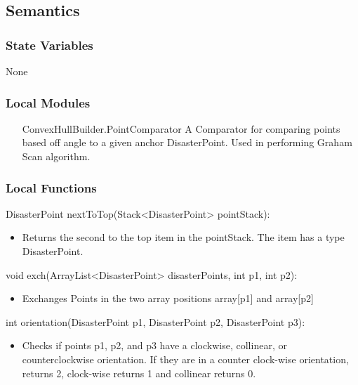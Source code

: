 \documentclass[12pt]{article}
\begin{document}
                \subsection*{Semantics}
                
                \subsubsection*{State Variables}
                
                None
    
                \subsubsection* {Local Modules}
                
                \begin{itemize}
                    \item[ConvexHullBuilder.PointComparator] A Comparator for comparing points based off angle to a given anchor DisasterPoint. Used in performing Graham Scan algorithm.
                \end{itemize}
                
                \subsubsection* {Local Functions}
                
                \noindent DisasterPoint nextToTop(Stack<DisasterPoint> pointStack):
                \begin{itemize}
                    \item Returns the second to the top item in the pointStack. The item has a type DisasterPoint.
                \end{itemize}
                
                \noindent void exch(ArrayList<DisasterPoint> disasterPoints, int p1, int p2):
                \begin{itemize}
                    \item Exchanges Points in the two array positions array[p1] and array[p2]
                \end{itemize}
                
                \noindent int orientation(DisasterPoint p1, DisasterPoint p2, DisasterPoint p3):
                \begin{itemize}
                    \item Checks if points p1, p2, and p3 have a clockwise, collinear, or counterclockwise orientation. If they are in a counter clock-wise orientation, returns 2, clock-wise returns 1 and collinear returns 0.
                \end{itemize}
                
\end{document}
